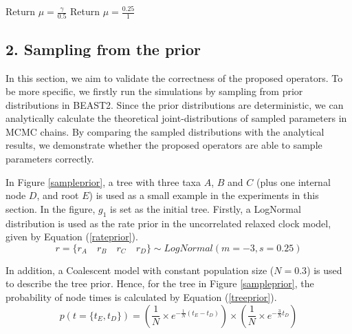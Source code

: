 \documentclass{bmcart}
\begin{document}
\begin{backmatter}
\begin{algorithm}
\begin{algorithmic}[1]
\STATE Return $\mu = \frac{\gamma }{{0.5}}$
\ENDIF
{}
\STATE Return $\mu = \frac{{0.25}}{1}$
\ENDIF

\end{algorithmic}
\end{algorithm}

\subsection*{2. Sampling from the prior}

In this section, we aim to validate the correctness of the proposed operators. To be more specific, we firstly run the simulations by sampling from prior distributions in BEAST2. Since the prior distributions are deterministic, we can analytically calculate the theoretical joint-distributions of sampled parameters in MCMC chains. By comparing the sampled distributions with the analytical results, we demonstrate whether the proposed operators are able to sample parameters correctly.

In Figure \ref{sampleprior}, a tree with three taxa $A$, $B$ and $C$ (plus one internal node $D$, and root $E$) is used as a small example in the experiments in this section. In the figure, $g_1$ is set as the initial tree. Firstly, a LogNormal distribution is used as the rate prior in the uncorrelated relaxed clock model, given by Equation (\ref{rateprior}).
\begin{equation}\label{rateprior}
r = \{{r_A}\quad{r_B}\quad{r_C}\quad{r_D}\} \sim LogNormal(m = -3, s = 0.25)
\end{equation}

In addition, a Coalescent model \cite{pybus2002genie} with constant population size ($N=0.3$) is used to describe the tree prior. Hence, for the tree in Figure \ref{sampleprior}, the probability of node times is calculated by Equation (\ref{treeprior}).
\begin{equation}\label{treeprior}
p(t=\{{t_E},{t_D}\}) = (\frac{1}{N} \times {e^{ - \frac{1}{N}({t_E} - {t_D})}}) \times (\frac{1}{N} \times {e^{ - \frac{3}{N}{t_D}}})
\end{equation}


\end{backmatter}
\end{document}
